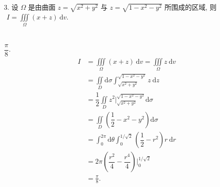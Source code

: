 \documentclass[lang=cn,12pt]{elegantbook}
\begin{document}
3. 设 $\Omega$ 是由曲面 $z=\sqrt{x^2+y^2}$ 与 $z=\sqrt{1-x^2-y^2}$ 所围成的区域, 则
$\begin{aligned}
	I=\iiint\limits_{\Omega} (x+z) \mathrm{~d} v.
\end{aligned}$
\\ \\

\begin{solution}
    $\dfrac{\pi}{8}.$
    $$\begin{aligned}
        I&=\iiint\limits_{\Omega} (x+z) \mathrm{~d} v=\iiint\limits_{\Omega} z \mathrm{~d} v\\
        &=\iint\limits_{D} \mathrm{d} \sigma \int_{\sqrt{x^2+y^2}}^{\sqrt{1-x^2-y^2}}
		    z \mathrm{~d} z\\
	    &=\dfrac{1}{2}\iint\limits_{D} z^2\bigg|_{\sqrt{x^2+y^2}}^{\sqrt{1-x^2-y^2}}\mathrm{d} \sigma\\
		&=\iint\limits_{D} \left(\dfrac{1}{2} - x^2 - y^2\right) \mathrm{d} \sigma\\
		&=\int_{0}^{2\pi} \mathrm{d} \theta \int_{0}^{1/\sqrt{2}}
		    \left(\dfrac{1}{2} - r^2\right)r \mathrm{~d} r\\
		&=2\pi \left(\dfrac{r^2}{4}-\dfrac{r^4}{4}\right)\bigg|_{0}^{1/\sqrt{2}}\\
		&=\frac{\pi}{8}.
	\end{aligned}$$
\end{solution}
\end{document}
